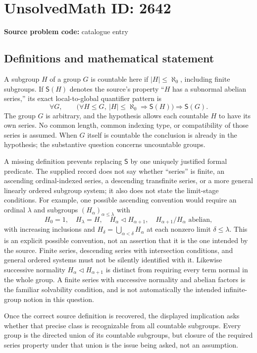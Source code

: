 \documentclass[11pt]{article}
\begin{document}
\section*{UnsolvedMath ID: 2642}
\textbf{Source problem code:} catalogue entry
\subsection{Definitions and mathematical statement}
A subgroup $H$ of a group $G$ is countable here if $|H|\le\aleph_0$, including finite subgroups. If $\mathsf S(H)$ denotes the source's property ``$H$ has a subnormal abelian series,'' its exact local-to-global quantifier pattern is
\[
 \forall G,\qquad
 \bigl(\forall H\le G,\ |H|\le\aleph_0\Longrightarrow\mathsf S(H)\bigr)
 \Longrightarrow\mathsf S(G).
\]
The group $G$ is arbitrary, and the hypothesis allows each countable $H$ to have its own series. No common length, common indexing type, or compatibility of those series is assumed. When $G$ itself is countable the conclusion is already in the hypothesis; the substantive question concerns uncountable groups.

A missing definition prevents replacing $\mathsf S$ by one uniquely justified formal predicate. The supplied record does not say whether ``series'' is finite, an ascending ordinal-indexed series, a descending transfinite series, or a more general linearly ordered subgroup system; it also does not state the limit-stage conditions. For example, one possible ascending convention would require an ordinal $\lambda$ and subgroups $(H_\alpha)_{\alpha\le\lambda}$ with
\[
 H_0=1,\quad H_\lambda=H,\quad
 H_\alpha\triangleleft H_{\alpha+1},\quad
 H_{\alpha+1}/H_\alpha\text{ abelian},
\]
with increasing inclusions and $H_\delta=\bigcup_{\alpha<\delta}H_\alpha$ at each nonzero limit $\delta\le\lambda$. This is an explicit possible convention, not an assertion that it is the one intended by the source. Finite series, descending series with intersection conditions, and general ordered systems must not be silently identified with it. Likewise successive normality $H_\alpha\triangleleft H_{\alpha+1}$ is distinct from requiring every term normal in the whole group. A finite series with successive normality and abelian factors is the familiar solvability condition, and is not automatically the intended infinite-group notion in this question.

Once the correct source definition is recovered, the displayed implication asks whether that precise class is recognizable from all countable subgroups. Every group is the directed union of its countable subgroups, but closure of the required series property under that union is the issue being asked, not an assumption.
\end{document}
